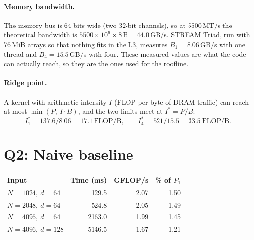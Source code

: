 \documentclass[11pt,a4paper]{article}
\begin{document}
\paragraph{Memory bandwidth.} The memory bus is 64 bits wide (two 32-bit channels), so at
5500\,MT/s the theoretical bandwidth is $5500 \times 10^6 \times 8\,\text{B} = 44.0$\,GB/s.
STREAM Triad, run with 76\,MiB arrays so that nothing fits in the L3, measures
$B_1 = 8.06$\,GB/s with one thread and $B_4 = 15.5$\,GB/s with four. These measured values are
what the code can actually reach, so they are the ones used for the roofline.

\paragraph{Ridge point.} A kernel with arithmetic intensity $I$ (FLOP per byte of DRAM traffic)
can reach at most $\min(P,\ I \cdot B)$, and the two limits meet at $I^\ast = P/B$:
\[
  I^\ast_1 = 137.6 / 8.06 = 17.1\ \text{FLOP/B}, \qquad
  I^\ast_4 = 521 / 15.5 = 33.5\ \text{FLOP/B}.
\]

\section*{Q2: Naive baseline}

\begin{center}
\begin{tabular}{@{}lrrr@{}}
\toprule
Input & Time (ms) & GFLOP/s & \% of $P_1$ \\
\midrule
$N=1024,\ d=64$  & 129.5  & 2.07 & 1.50 \\
$N=2048,\ d=64$  & 524.8  & 2.05 & 1.49 \\
$N=4096,\ d=64$  & 2163.0 & 1.99 & 1.45 \\
$N=4096,\ d=128$ & 5146.5 & 1.67 & 1.21 \\
\bottomrule
\end{tabular}
\end{center}
\end{document}
